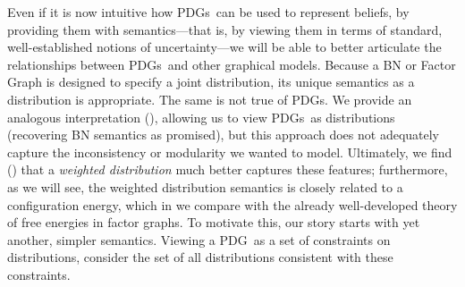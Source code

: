 \documentclass{article}
\newcommand{\MN}{PDG}
\newcommand{\MNs}{\MN s}
\numberwithin{equation}{section}
\begin{document}
\begin{notfocus}
	Even if it is now intuitive how \MNs\ can be used to represent beliefs, by providing them with semantics---that is, by viewing them in terms of standard, well-established notions of uncertainty---we will be able to better articulate the relationships between \MNs\ and other graphical models. 
	Because a BN or Factor Graph is designed to specify a joint distribution, its unique semantics as a distribution is appropriate. The same is not true of \MNs. 
	We provide an analogous interpretation (), allowing us to view \MNs\ as distributions (recovering BN semantics as promised), but this approach does not adequately capture the inconsistency or modularity we wanted to model. 
	Ultimately, we find () that a \emph{weighted distribution} \parencite[cf.][]{halpern2015weighted} much better captures these features; furthermore, as we will see, the weighted distribution semantics is closely related to a configuration energy, which in  we compare with the already well-developed theory of free energies in factor graphs. 
	To motivate this, our story starts with yet another, simpler semantics. Viewing a \MN\ as a set of constraints on distributions, consider the set of all distributions consistent with these constraints.
	

\end{notfocus}
\end{document}
